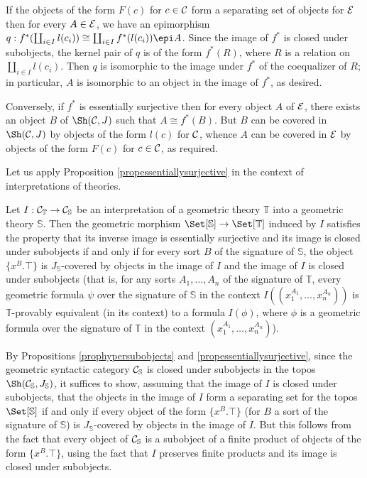 \documentclass[a4paper,12pt]{article}
\begin{document}
\begin{proofs}
	If the objects of the form $F(c)$ for $c\in {\cal C}$ form a separating set of objects for $\cal E$ then for every $A\in {\cal E}$, we have an epimorphism $q:f^{\ast}(\coprod_{i\in I}l(c_{i}))\cong \coprod_{i\in I}f^{\ast}(l(c_{i}))\epi A$. Since the image of $f^{\ast}$ is closed under subobjects, the kernel pair of $q$ is of the form $f^{\ast}(R)$, where $R$ is a relation on $\coprod_{i\in I}l(c_{i})$. Then $q$ is isomorphic to the image under $f^{\ast}$ of the coequalizer of $R$; in particular, $A$ is isomorphic to an object in the image of $f^{\ast}$, as desired.
	
	Conversely, if $f^{\ast}$ is essentially surjective then for every object $A$ of $\cal E$, there exists an object $B$ of $\Sh({\cal C}, J)$ such that $A\cong f^{\ast}(B)$. But $B$ can be covered in $\Sh({\cal C}, J)$ by objects of the form $l(c)$ for $\cal C$, whence $A$ can be covered in $\cal E$ by objects of the form $F(c)$ for $c\in {\cal C}$, as required.  
\end{proofs}

Let us apply Proposition \ref{propessentiallysurjective} in the context of interpretations of theories.

\begin{corollary}
		Let $I:{\cal C}_{\mathbb T}\to {\cal C}_{\mathbb S}$ be an interpretation of a geometric theory $\mathbb T$ into a geometric theory ${\mathbb S}$. Then the geometric morphism $\Set[{\mathbb S}]\to \Set[{\mathbb T}]$ induced by $I$ satisfies the property that its inverse image is essentially surjective and its image is closed under subobjects if and only if for every sort $B$ of the signature of $\mathbb S$, the object $\{x^{B}. \top\}$ is $J_{\mathbb S}$-covered by objects in the image of $I$ and the image of $I$ is closed under subobjects (that is, for any sorts $A_{1}, \ldots, A_{n}$ of the signature of $\mathbb T$, every geometric formula $\psi$ over the signature of $\mathbb S$ in the context $I((x_{1}^{A_{1}}, \ldots, x_{n}^{A_{n}}))$ is $\mathbb T$-provably equivalent (in its context) to a formula $I(\phi)$, where $\phi$ is a geometric formula over the signature of $\mathbb T$ in the context $(x_{1}^{A_{1}}, \ldots, x_{n}^{A_{n}})$). 	    
\end{corollary}

\begin{proofs}
	By Propositions \ref{prophypersubobjects} and \ref{propessentiallysurjective}, since the geometric syntactic category ${\cal C}_{\mathbb S}$ is closed under subobjects in the topos $\Sh({\cal C}_{\mathbb S}, J_{\mathbb S})$, it suffices to show, assuming that the image of $I$ is closed under subobjects, that the objects in the image of $I$ form a separating set for the topos $\Set[{\mathbb S}]$ if and only if every object of the form $\{x^{B}. \top\}$ (for $B$ a sort of the signature of $\mathbb S$) is $J_{\mathbb S}$-covered by objects in the image of $I$. But this follows from the fact that every object of ${\cal C}_{\mathbb S}$ is a subobject of a finite product of objects of the form $\{x^{B}. \top\}$, using the fact that $I$ preserves finite products and its image is closed under subobjects.  
\end{proofs}
\end{document}
